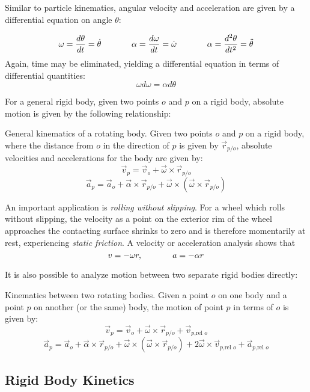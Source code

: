 Similar to particle kinematics, angular velocity and acceleration are given by a differential equation on angle $\theta$:

\[\omega = \frac{d\theta}{dt} = \dot \theta \hspace{0.5in} \alpha = \frac{d\omega}{dt} = \dot \omega\hspace{0.5in} \alpha=\frac{d^2\theta}{dt^2} = \ddot \theta\] Again, time may be eliminated, yielding a differential equation in terms of differential quantities: \[\omega d\omega = \alpha d\theta\]

For a general rigid body, given two points $o$ and $p$ on a rigid body, absolute motion is given by the following relationship:

\begin{shaded}
General kinematics of a rotating body. Given two points $o$ and $p$ on a rigid body, where the distance from $o$ in the direction of $p$ is given by $\vec{r}_{p/o}$, absolute velocities and accelerations for the body are given by:
    \[\vec{v}_p = \vec{v}_o + \vec{\omega}\times \vec{r}_{p/o}\]
    \[\vec{a}_p = \vec{a}_o + \vec{\alpha} \times \vec{r}_{p/o} + \vec{\omega}\times (\vec{\omega} \times \vec{r}_{p/o})\]
\end{shaded}

An important application is \textit{rolling without slipping}. For a wheel which rolls without slipping, the velocity as a point on the exterior rim of the wheel approaches the contacting surface shrinks to zero and is therefore momentarily at rest, experiencing \textit{static friction}. A velocity or acceleration analysis shows that \[v = -\omega r,\hspace{0.5in}a=-\alpha r\]

It is also possible to analyze motion between two separate rigid bodies directly:

\begin{shaded}
Kinematics between two rotating bodies. Given a point $o$ on one body and a point $p$ on another (or the same) body, the motion of point $p$ in terms of $o$ is given by:
    \[\vec{v}_p = \vec{v}_o + \vec{\omega}\times\vec{r}_{p/o} + \vec{v}_{p\text{,rel }o}\]
    \[\vec{a}_p = \vec{a}_o + \vec{\alpha}\times\vec{r}_{p/o}+\vec\omega\times(\vec{\omega}\times\vec{r}_{p/o}) + 2\vec\omega \times \vec{v}_{p\text{,rel }o} + \vec{a}_{p\text{,rel }o}\]
\end{shaded}

\subsection{Rigid Body Kinetics}

